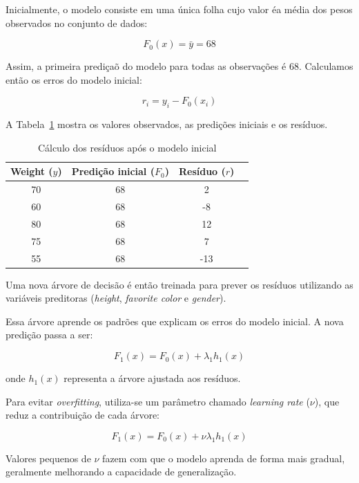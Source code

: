 \documentclass{article}
\begin{document}
Inicialmente, o modelo consiste em uma única folha cujo
valor éa média dos pesos observados no conjunto de dados:

\begin{equation*}
    F_0(x) = \bar{y} = 68
\end{equation*}

Assim, a primeira prediçaõ do modelo para todas as observações 
é $68$. Calculamos então os erros do modelo inicial:

\begin{equation*}
    r_i = y_i - F_0(x_i)
\end{equation*}

A Tabela~\ref{tab:gb_residuals} mostra os valores observados,
as predições iniciais e os resíduos.

\begin{table}[h]
\centering
\begin{tabular}{cccc}
\hline
Weight ($y$) & Predição inicial ($F_0$) & Resíduo ($r$) \\
\hline
70 & 68 & 2 \\
60 & 68 & -8 \\
80 & 68 & 12 \\
75 & 68 & 7 \\
55 & 68 & -13 \\
\hline
\end{tabular}
\caption{Cálculo dos resíduos após o modelo inicial}
\label{tab:gb_residuals}
\end{table}

Uma nova árvore de decisão é então treinada para prever os 
resíduos utilizando as variáveis preditoras (\textit{height},
\textit{favorite color} e \textit{gender}).

Essa árvore aprende os padrões que explicam os erros do modelo
inicial. A nova predição passa a ser:

\begin{equation*}
    F_1(x) = F_0(x) + \lambda_1 h_1(x)
\end{equation*}

onde $h_1(x)$ representa a árvore ajustada aos resíduos.

Para evitar \textit{overfitting}, utiliza-se um parâmetro chamado
\textit{learning rate} ($\nu$), que reduz a contribuição de cada árvore:

\begin{equation*}
    F_1(x) = F_0(x) + \nu \lambda_1 h_1(x)
\end{equation*}

Valores pequenos de $\nu$ fazem com que o modelo aprenda de forma
mais gradual, geralmente melhorando a capacidade de generalização.
\end{document}
